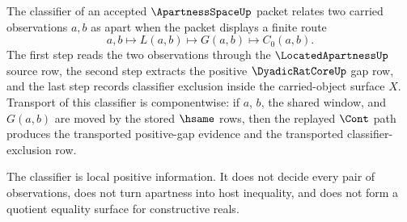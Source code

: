 \begin{definition}
\label{def:apartness-space-classifier}
The classifier of an accepted $\ApartnessSpaceUp$ packet relates two carried
observations $a,b$ as apart when the packet displays a finite route
$$
a,b\longmapsto L(a,b)\longmapsto G(a,b)\longmapsto C_0(a,b).
$$
The first step reads the two observations through the $\LocatedApartnessUp$
source row, the second step extracts the positive $\DyadicRatCoreUp$ gap row,
and the last step records classifier exclusion inside the carried-object
surface $X$. Transport of this classifier is componentwise: if $a$, $b$, the
shared window, and $G(a,b)$ are moved by the stored $\hsame$ rows, then the
replayed $\Cont$ path produces the transported positive-gap evidence and the
transported classifier-exclusion row.

The classifier is local positive information. It does not decide every pair of
observations, does not turn apartness into host inequality, and does not form a
quotient equality surface for constructive reals.
\end{definition}

